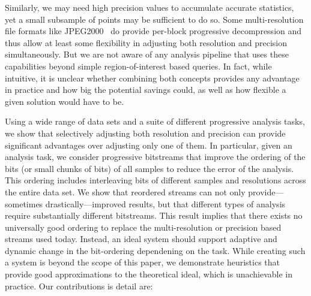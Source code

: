                        Similarly, we may need high precision values to
                       accumulate accurate statistics, yet a small subsample of points may be
                       sufficient to do so.
                               Some multi-resolution file formats like JPEG2000~\cite{jpeg2001} do
provide per-block progressive decompression and thus allow at least some
flexibility
in adjusting both resolution and precision simultaneously. But we are
not aware of any analysis pipeline that uses these capabilities beyond
simple region-of-interest based queries. In fact, while intuitive, it
is unclear whether combining both concepts provides any
advantage in practice and how big the potential savings could, as well as
how flexible a given solution would have to be.

Using a wide range of data sets and a suite of different progressive analysis
tasks, we show that selectively adjusting both resolution and precision can
provide significant advantages over adjusting only one of them. In
particular, given an analysis task, we consider progressive
bitstreams that improve the ordering of the bits (or small chunks of bits)
of all samples to reduce the error of the analysis. This ordering includes
interleaving bits of different samples and resolutions across the entire
data set. We show that reordered streams can not only provide---sometimes
drastically---improved results, but that different types of
analysis require substantially different bitstreams. This result implies that
there exists no universally good ordering to replace the
multi-resolution or precision based streams used today.
Instead, an ideal system should support adaptive and dynamic change in the
bit-ordering dependening on the task.
While creating such a system is
beyond the scope of this paper, we demonstrate heuristics that provide
good approximations to the theoretical ideal, which is unachievable in
practice. Our contributions is detail are:

